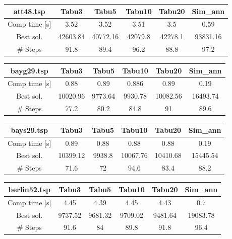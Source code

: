 \documentclass[a4paper,10pt]{article}
\begin{document}
\begin{center}
\begin{tabular}{|c|c|c|c|c|c|}
\hline 
att48.tsp & Tabu3 & Tabu5 & Tabu10 & Tabu20 & Sim\_ann \\ 
\hline 
Comp time [s] & 3.52 & 3.52 & 3.51 & 3.5 & 0.59 \\ 
\hline 
Best sol. & 42603.84 & 40772.16 & 42079.8 & 42278.1 & 93831.16 \\ 
\hline 
\# Steps & 91.8 & 89.4 & 96.2 & 88.8 & 97.2 \\ 
\hline 
\end{tabular} 
\end{center}

\begin{center}
\begin{tabular}{|c|c|c|c|c|c|}
\hline 
bayg29.tsp & Tabu3 & Tabu5 & Tabu10 & Tabu20 & Sim\_ann \\
\hline 
Comp time [s] & 0.88 & 0.89 & 0.886 & 0.89 & 0.19 \\ 
\hline 
Best sol. & 10020.96 & 9773.64 & 9930.78 & 10082.56 & 16493.74 \\ 
\hline 
\# Steps & 77.2 & 80.2 & 84.8 & 91 & 89.6 \\ 
\hline 
\end{tabular} 
\end{center}

\begin{center}
\begin{tabular}{|c|c|c|c|c|c|}
\hline 
bays29.tsp & Tabu3 & Tabu5 & Tabu10 & Tabu20 & Sim\_ann \\
\hline 
Comp time [s] & 0.89 & 0.88 & 0.88 & 0.88 & 0.19 \\ 
\hline 
Best sol. & 10399.12 & 9938.8 & 10067.76 & 10410.68 & 15445.54 \\ 
\hline 
\# Steps & 71.6 & 72 & 94.6 & 83.4 & 88.2 \\ 
\hline 
\end{tabular} 
\end{center}

\begin{center}
\begin{tabular}{|c|c|c|c|c|c|}
\hline 
berlin52.tsp & Tabu3 & Tabu5 & Tabu10 & Tabu20 & Sim\_ann \\
\hline 
Comp time [s] & 4.45 & 4.39 & 4.45 & 4.43 & 0.7 \\ 
\hline 
Best sol. & 9737.52 & 9681.32 & 9709.02 & 9481.64 & 19083.78 \\ 
\hline 
\# Steps & 91.6 & 84 & 89.8 & 91.8 & 96.4\\ 
\hline 
\end{tabular} 
\end{center}
\end{document}
